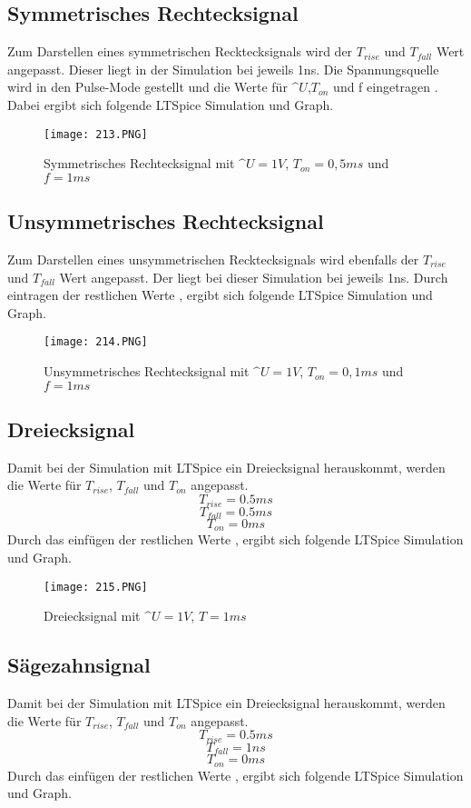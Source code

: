 \subsection{Symmetrisches Rechtecksignal}
Zum Darstellen eines symmetrischen Recktecksignals wird der $T_{rise}$ und $T_{fall}$ Wert angepasst. Dieser liegt in der Simulation bei jeweils 1ns. Die Spannungsquelle wird in den Pulse-Mode gestellt und die Werte für $\^{U}$,$T_{on}$ und f eingetragen . Dabei ergibt sich folgende LTSpice Simulation und Graph. 
\begin{figure}[ht!]
\centering
\texttt{[image: 213.PNG]}
\caption{Symmetrisches Rechtecksignal mit $\^{U}=1V$, $T_{on}=0,5 ms$ und $f=1ms$}
\label{fig: symRechtecksignal}
\end{figure}

\subsection{Unsymmetrisches Rechtecksignal}
Zum Darstellen eines unsymmetrischen Recktecksignals wird ebenfalls der $T_{rise}$ und $T_{fall}$ Wert angepasst. Der liegt bei dieser Simulation bei jeweils 1ns. Durch eintragen der restlichen Werte , ergibt sich folgende LTSpice Simulation und Graph.
\begin{figure}[ht!]
\centering
\texttt{[image: 214.PNG]}
\caption{Unsymmetrisches Rechtecksignal mit $\^{U}=1V$, $T_{on}=0,1 ms$ und $f=1ms$}
\label{fig: unsymRechtecksignal}
\end{figure}

\subsection{Dreiecksignal}
Damit bei der Simulation mit LTSpice ein Dreiecksignal herauskommt, werden die Werte für $T_{rise}$, $T_{fall}$ und $T_{on}$ angepasst. 
$$T_{rise}=0.5ms$$
$$T_{fall}=0.5ms$$
$$T_{on}=0ms$$
Durch das einfügen der restlichen Werte , ergibt sich folgende LTSpice Simulation und Graph.
\begin{figure}[ht!]
\centering
\texttt{[image: 215.PNG]}
\caption{Dreiecksignal mit $\^{U}=1V$, $T=1ms$ }
\label{fig: Dreiecksignal}
\end{figure}
\newpage
\subsection{Sägezahnsignal}
Damit bei der Simulation mit LTSpice ein Dreiecksignal herauskommt, werden die Werte für $T_{rise}$, $T_{fall}$ und $T_{on}$ angepasst. 
$$T_{rise}=0.5ms$$
$$T_{fall}=1ns$$
$$T_{on}=0ms$$
Durch das einfügen der restlichen Werte , ergibt sich folgende LTSpice Simulation und Graph.

